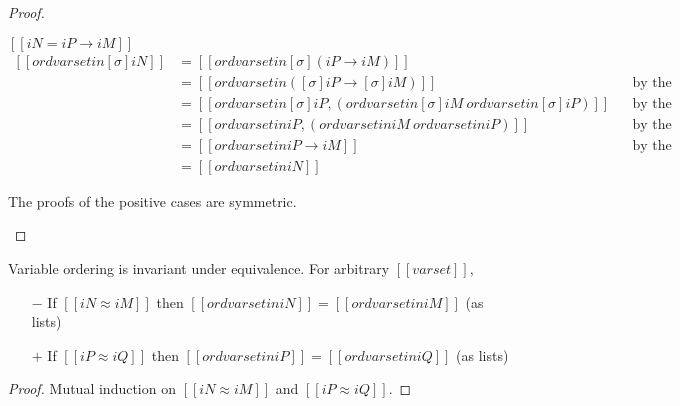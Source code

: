 \begin{proof}
\begin{caseof}
    \item $[[iN = iP → iM]]$\\
       $ \begin{aligned}
        [[ ord varset in [σ]iN ]] &= [[ ord varset in [σ](iP → iM) ]] \\
                                   &= [[ ord varset in ([σ]iP → [σ]iM) ]]
                                   && \text{by the definition of substitution}\\
                                   &= [[ ord varset in [σ]iP, (ord varset in [σ]iM \ {ord varset in [σ]iP}) ]]
                                   && \text{by the definition of ordering}\\
                                   &= [[ ord varset in iP, (ord varset in iM \ {ord varset in iP}) ]]
                                   && \text{by the induction hypothesis}\\
                                   &= [[ ord varset in iP → iM ]]
                                   && \text{by the definition of ordering}\\
                                   &= [[ ord varset in iN ]]
       \end{aligned} $
    \item The proofs of the positive cases are symmetric.
  \end{caseof}
\end{proof}

\begin{lemma}
  \label{lemma:ord-completeness}
  Variable ordering is invariant under equivalence. For arbitrary $[[varset]]$,
   \begin{itemize}
  \item[$-$] If $[[iN ≈ iM]]$ then $[[ord varset in iN]] = [[ord varset in iM]]$ (as lists)
  \item[$+$] If $[[iP ≈ iQ]]$ then $[[ord varset in iP]] = [[ord varset in iQ]]$ (as lists)
  \end{itemize}
\end{lemma}
\begin{proof}
  Mutual induction on $[[iN ≈ iM]]$ and $[[iP ≈ iQ]]$.
\end{proof}

















